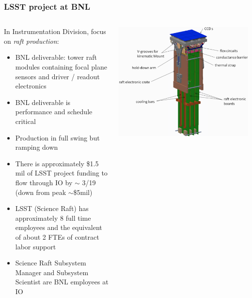 \documentclass[aspectratio=169]{beamer}
\begin{document}
\begin{frame}

  \frametitle{LSST project at BNL}

  \begin{columns}
    \begin{column}{10cm}
  In Instrumentation Division, focus on \emph{raft production}:
  \begin{itemize}

  \item BNL deliverable: tower raft modules containing focal plane
    sensors and driver / readout electronics

  \item BNL deliverable is performance and schedule critical

  \item Production in full swing but ramping down 

  \item There is approximately \$1.5 mil of LSST project funding to  flow
    through IO by $\sim$ 3/19 (down from peak $\sim$\$5mil)

  \item LSST (Science Raft) has approximately 8 full time employees and the
  equivalent of about 2 FTEs of contract labor support 
  
  \item Science Raft Subsystem Manager and Subsystem Scientist are BNL
  employees at IO

 \end{itemize}
    \end{column}
    \begin{column}{5cm}
      \includegraphics[width=\linewidth]{./lsstraftx.png}
    \end{column}
  \end{columns}
  

\end{frame}
\end{document}
